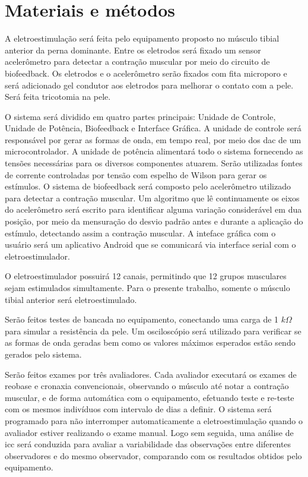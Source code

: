 \section{Materiais e métodos}

A eletroestimulação será feita pelo equipamento proposto no músculo tibial anterior da perna dominante. Entre os eletrodos será fixado um sensor acelerômetro para detectar a contração muscular por meio do circuito de biofeedback. Os eletrodos e o acelerômetro serão fixados com fita microporo e será adicionado gel condutor aos eletrodos para melhorar o contato com a pele. Será feita tricotomia na pele.

O sistema será dividido em quatro partes principais: Unidade de Controle, Unidade de Potência, Biofeedback e Interface Gráfica. A unidade de controle será responsável por gerar as formas de onda, em tempo real, por meio dos \ac{dac} de um microcontrolador. A unidade de potência alimentará todo o sistema fornecendo as tensões necessárias para os diversos componentes atuarem. Serão utilizadas fontes de corrente controladas por tensão com espelho de Wilson para gerar os estímulos. O sistema de biofeedback será composto pelo acelerômetro utilizado para detectar a contração muscular. Um algoritmo que lê continuamente os eixos do acelerômetro será escrito para identificar alguma variação considerável em dua posição, por meio da mensuração do desvio padrão antes e durante a aplicação do estímulo, detectando assim a contração muscular. A inteface gráfica com o usuário será um aplicativo Android que se comunicará via interface serial com o eletroestimulador.

O eletroestimulador possuirá 12 canais, permitindo que 12 grupos musculares sejam estimulados simultamente. Para o presente trabalho, somente o músculo tibial anterior será eletroestimulado.

Serão feitos testes de bancada no equipamento, conectando uma carga de 1 $k\Omega$ para simular a resistência da pele. Um osciloscópio será utilizado para verificar se as formas de onda geradas bem como os valores máximos esperados estão sendo gerados pelo sistema.

Serão feitos exames por três avaliadores. Cada avaliador executará os exames de reobase e cronaxia convencionais, observando o músculo até notar a contração muscular, e de forma automática com o equipamento, efetuando teste e re-teste com os mesmos indivíduos com intervalo de dias a definir. O sistema será programado para não interromper automaticamente a eletroestimulação quando o avaliador estiver realizando o exame manual. Logo sem seguida, uma análise de \ac{icc} será conduzida para avaliar a variabilidade das observações entre diferentes observadores e do mesmo observador, comparando com os resultados obtidos pelo equipamento.

